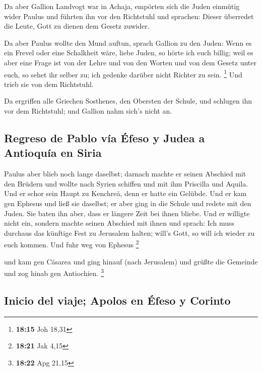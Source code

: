  Da aber Gallion Landvogt war in Achaja, empörten sich
die Juden einmütig wider Paulus und führten ihn vor den Richtstuhl
 und sprachen: Dieser überredet die Leute, Gott zu dienen
dem Gesetz zuwider.

 Da aber Paulus wollte den Mund auftun, sprach Gallion zu
den Juden: Wenn es ein Frevel oder eine Schalkheit wäre, liebe Juden, so
hörte ich euch billig;  weil es aber eine Frage ist von
der Lehre und von den Worten und von dem Gesetz unter euch, so sehet ihr
selber zu; ich gedenke darüber nicht Richter zu sein. \footnote{\textbf{18:15}
  Joh 18,31}  Und trieb sie von dem Richtstuhl.

 Da ergriffen alle Griechen Sosthenes, den Obersten der
Schule, und schlugen ihn vor dem Richtstuhl; und Gallion nahm sich's
nicht an.

\hypertarget{regreso-de-pablo-vuxeda-uxe9feso-y-judea-a-antioquuxeda-en-siria}{%
\subsection{Regreso de Pablo vía Éfeso y Judea a Antioquía en
Siria}\label{regreso-de-pablo-vuxeda-uxe9feso-y-judea-a-antioquuxeda-en-siria}}

 Paulus aber blieb noch lange daselbst; darnach machte er
seinen Abschied mit den Brüdern und wollte nach Syrien schiffen und mit
ihm Priscilla und Aquila. Und er schor sein Haupt zu Kenchreä, denn er
hatte ein Gelübde.  Und er kam gen Ephesus und ließ sie
daselbst; er aber ging in die Schule und redete mit den Juden.
 Sie baten ihn aber, dass er längere Zeit bei ihnen
bliebe. Und er willigte nicht ein,  sondern machte seinen
Abschied mit ihnen und sprach: Ich muss durchaus das künftige Fest zu
Jerusalem halten; will's Gott, so will ich wieder zu euch kommen. Und
fuhr weg von Ephesus \footnote{\textbf{18:21} Jak 4,15}

 und kam gen Cäsarea und ging hinauf (nach Jerusalem) und
grüßte die Gemeinde und zog hinab gen Antiochien. \footnote{\textbf{18:22}
  Apg 21,15}

\hypertarget{inicio-del-viaje-apolos-en-uxe9feso-y-corinto}{%
\subsection{Inicio del viaje; Apolos en Éfeso y
Corinto}\label{inicio-del-viaje-apolos-en-uxe9feso-y-corinto}}

